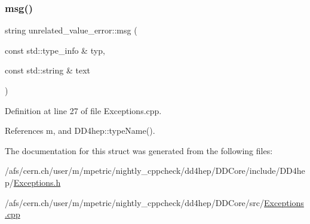 \subsubsection{\texorpdfstring{msg()}{msg()}}
{\footnotesize\ttfamily string unrelated\+\_\+value\+\_\+error\+::msg (\begin{DoxyParamCaption}\item[{const std\+::type\+\_\+info \&}]{typ,  }\item[{const std\+::string \&}]{text }\end{DoxyParamCaption})\hspace{0.3cm}{\ttfamily [static]}}



Definition at line 27 of file Exceptions.\+cpp.



References m, and D\+D4hep\+::type\+Name().



The documentation for this struct was generated from the following files\+:\begin{DoxyCompactItemize}
\item 
/afs/cern.\+ch/user/m/mpetric/nightly\+\_\+cppcheck/dd4hep/\+D\+D\+Core/include/\+D\+D4hep/\hyperlink{_d_d_core_2include_2_d_d4hep_2_exceptions_8h}{Exceptions.\+h}\item 
/afs/cern.\+ch/user/m/mpetric/nightly\+\_\+cppcheck/dd4hep/\+D\+D\+Core/src/\hyperlink{_exceptions_8cpp}{Exceptions.\+cpp}\end{DoxyCompactItemize}

